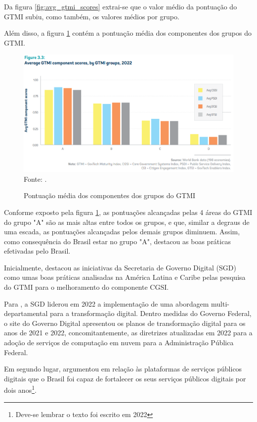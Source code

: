 Da figura \ref{fig:avg_gtmi_scores} extrai-se que o valor médio da pontuação do GTMI subiu, como também, os valores médios por grupo. 

Além disso, a figura \ref{fig:avg_gtmi_scores_groups} contém a pontuação média dos componentes dos grupos do GTMI. 

\begin{figure}[H]
	\centering
	\caption{Pontuação média dos componentes dos grupos do GTMI}
	\includegraphics[width=1\linewidth]{figuras/avg_gtmi_scores_groups}
	\label{fig:avg_gtmi_scores_groups}
	\footnotesize{Fonte: \cite{gtmi_2022}.}
\end{figure}

Conforme exposto pela figura \ref{fig:avg_gtmi_scores_groups}, as pontuações alcançadas pelas 4 áreas do GTMI do grupo "A" são as mais altas entre todos os grupos, e que, similar a degraus de uma escada, as pontuações alcançadas pelos demais grupos diminuem. Assim, como consequência do Brasil estar no grupo "A", \cite{gtmi_2022_latinamerica} destacou as boas práticas efetivadas pelo Brasil. 

Inicialmente, \cite{gtmi_2022_latinamerica} destacou as iniciativas da Secretaria de Governo Digital (SGD) como umas boas práticas analisadas na América Latina e Caribe pelas pesquisa do GTMI para o melhoramento do componente CGSI. 

Para \cite{gtmi_2022_latinamerica}, a SGD liderou em 2022 a implementação de uma abordagem multi-departamental para a transformação digital. Dentro medidas do Governo Federal, o site do Governo Digital apresentou os planos de transformação digital para os anos de 2021 e 2022, concomitantemente, as diretrizes atualizadas em 2022 para a adoção de serviços de computação em nuvem para a Administração Pública Federal.

Em segundo lugar, \cite{gtmi_2022_latinamerica} argumentou em relação às plataformas de serviços públicos digitais que o Brasil foi capaz de fortalecer os seus serviços públicos digitais por dois anos\footnote{Deve-se lembrar o texto foi escrito em 2022}. 

